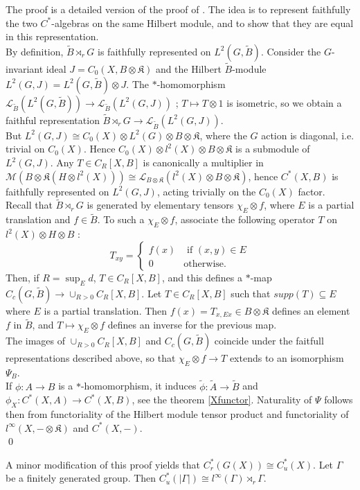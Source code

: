 \begin{dem}
The proof is a detailed version of the proof of \cite{SkTuYu}. The idea is to represent faithfully the two $C^*$-algebras on the same Hilbert module, and to show that they are equal in this representation.\\

By definition, $\tilde B\rtimes_r G$ is faithfully represented on $L^2(G,\tilde B)$. Consider the $G$-invariant ideal $J= C_0(X,B\otimes\mathfrak K)$ and the Hilbert $\tilde B$-module $L^2(G,J) = L^2(G,\tilde B)\otimes J$. The $*$-homomorphism $\mathcal L_{\tilde B}(L^2(G,\tilde B)) \rightarrow \mathcal L_{\tilde B}(L^2(G,J))$ ; $T\mapsto T\otimes 1 $ is isometric, so we obtain a faithful representation $\tilde B\rtimes_r G \rightarrow \mathcal L_{\tilde B}(L^2(G,J))$.\\

But $L^2(G,J)  \cong C_0(X) \otimes L^2(G)\otimes B\otimes \mathfrak K$, where the $G$ action is diagonal, i.e. trivial on $C_0(X)$. Hence $C_0(X)\otimes l^2(X) \otimes B \otimes \mathfrak K$ is a submodule of $L^2(G,J)$. Any $T\in C_R[X,B]$ is canonically a multiplier in $\mathcal M(B\otimes  \mathfrak K(H\otimes l^2(X))) \cong \mathcal L_{B\otimes \mathfrak K}(l^2 (X) \otimes B \otimes \mathfrak K)$, hence $C^*(X,B)$ is faithfully represented on $L^2(G,J)$, acting trivially on the $C_0(X)$ factor. \\

Recall that $\tilde B\rtimes_r G$ is generated by elementary tensors $\chi_E\otimes f$, where $E$ is a partial translation and $f\in\tilde B$. To such a $\chi_E\otimes f$, associate the following operator $T$ on $l^2(X)\otimes H\otimes B$ : 
\[T_{xy} =\left\{\begin{array}{ll} f(x) & \text{ if }(x,y)\in E\\ 0 & \text{otherwise.}\end{array}\right. \]
Then, if $R=\sup_E d$, $T\in C_R[X,B]$, and this defines a $*$-map $C_c(G,\tilde B) \rightarrow \cup_{R>0}C_R[X,B]$. Let $T \in C_R[X,B]$ such that $supp(T)\subseteq E$ where $E$ is a partial translation. Then $f(x) = T_{x,Ex}\in B\otimes \mathfrak K$ defines an element $f$ in $\tilde B$, and $T \mapsto \chi_E \otimes f$ defines an inverse for the previous map.\\    

The images of $\cup_{R>0} C_R[X,B]$ and $C_c(G,\tilde B)$ coincide under the faitfull representations described above, so that $\chi_E\otimes f\rightarrow T$ extends to an isomorphism $\Psi_B$.\\

If $\phi : A\rightarrow B$ is a $*$-homomorphism, it induces $\tilde \phi : \tilde A\rightarrow \tilde B$ and $\phi_X : C^*(X,A)\rightarrow C^*(X,B)$, see the theorem \ref{Xfunctor}. Naturality of $\Psi$ follows then from functoriality of the Hilbert module tensor product and functoriality of $l^\infty(X, - \otimes \mathfrak K)$ and $C^*(X, - )$.\\   
\qed
\end{dem}

\begin{rk} A minor modification of this proof yields that $C_r^*(G(X))\cong C^*_u(X)$. Let $\Gamma$ be a finitely generated group. Then $C_u^*(| \Gamma |)\cong l^\infty( \Gamma)\rtimes_r \Gamma  $.
\end{rk}
